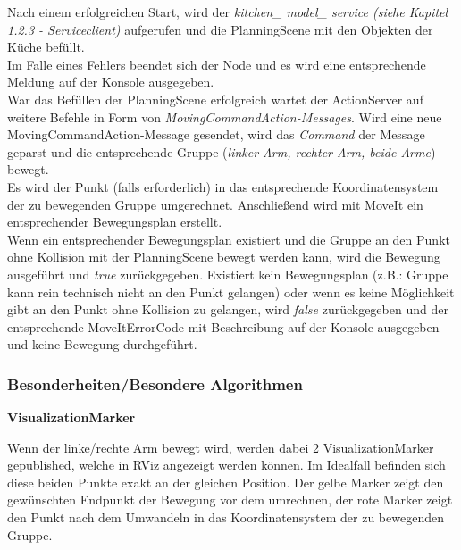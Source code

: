 \documentclass{suturo}
\begin{document}
Nach einem erfolgreichen Start, wird der \textit{kitchen\_ model\_ service (siehe Kapitel 1.2.3 - Serviceclient)} aufgerufen und die PlanningScene mit den Objekten der Küche befüllt. \\
Im Falle eines Fehlers beendet sich der Node und es wird eine entsprechende Meldung auf der Konsole ausgegeben. \\
War das Befüllen der PlanningScene erfolgreich wartet der ActionServer auf weitere Befehle in Form von \textit{MovingCommandAction-Messages}.
Wird eine neue MovingCommandAction-Message gesendet, wird das \textit{Command} der Message geparst und die entsprechende Gruppe (\textit{linker Arm, rechter Arm, beide Arme}) bewegt. \\
Es wird der Punkt (falls erforderlich) in das entsprechende Koordinatensystem der zu bewegenden Gruppe umgerechnet. Anschließend wird mit MoveIt ein entsprechender Bewegungsplan erstellt.\\ 
Wenn ein entsprechender Bewegungsplan existiert und die Gruppe an den Punkt ohne Kollision mit der PlanningScene bewegt werden kann, wird die Bewegung ausgeführt und \textit{true} zurückgegeben.
Existiert kein Bewegungsplan (z.B.: Gruppe kann rein technisch nicht an den Punkt gelangen) oder  wenn es keine Möglichkeit gibt an den Punkt ohne Kollision zu gelangen, wird \textit{false} zurückgegeben und der entsprechende MoveItErrorCode mit Beschreibung auf der Konsole ausgegeben und keine Bewegung durchgeführt. \\





\subsubsection{Besonderheiten/Besondere Algorithmen}

\textbf{VisualizationMarker}

Wenn der linke/rechte Arm bewegt wird, werden dabei 2 VisualizationMarker gepublished, welche in RViz angezeigt werden können. Im Idealfall befinden sich diese beiden Punkte exakt an der gleichen Position. Der gelbe Marker zeigt den gewünschten Endpunkt der Bewegung vor dem umrechnen, der rote Marker zeigt den Punkt nach dem Umwandeln in das Koordinatensystem der zu bewegenden Gruppe.

\end{document}
